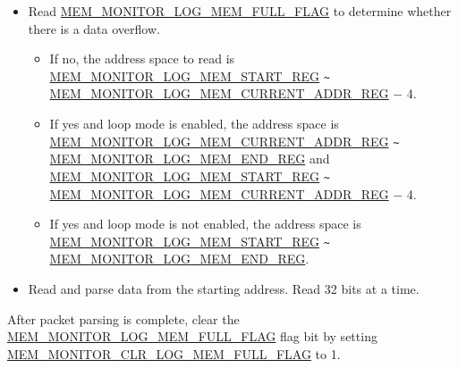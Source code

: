 \documentclass[main\_\_EN.tex]{subfiles}
\begin{document}
\begin{itemize}
    \item Read \hyperref[fielddesc:MEMMONITORLOGMEMFULLFLAG]{MEM\_MONITOR\_LOG\_MEM\_FULL\_FLAG} to determine whether there is a data overflow.
    \begin{itemize} 
        \item If no, the address space to read is \hyperref[regdesc:MEMMONITORLOGMEMSTARTREG]{MEM\_MONITOR\_LOG\_MEM\_START\_REG}  \verb+~+ \hyperref[regdesc:MEMMONITORLOGMEMCURRENTADDRREG]{MEM\_MONITOR\_LOG\_MEM\_CURRENT\_ADDR\_REG} $-$ 4.
        \item If yes and loop mode is enabled, the address space is \hyperref[regdesc:MEMMONITORLOGMEMCURRENTADDRREG]{MEM\_MONITOR\_LOG\_MEM\_CURRENT\_ADDR\_REG} \verb+~+ \hyperref[regdesc:MEMMONITORLOGMEMENDREG]{MEM\_MONITOR\_LOG\_MEM\_END\_REG} and \hyperref[regdesc:MEMMONITORLOGMEMSTARTREG]{MEM\_MONITOR\_LOG\_MEM\_START\_REG} \verb+~+ \hyperref[regdesc:MEMMONITORLOGMEMCURRENTADDRREG]{MEM\_MONITOR\_LOG\_MEM\_CURRENT\_ADDR\_REG} $-$ 4.
        \item If yes and loop mode is not enabled, the address space is \hyperref[regdesc:MEMMONITORLOGMEMSTARTREG]{MEM\_MONITOR\_LOG\_MEM\_START\_REG} \verb+~+ \hyperref[regdesc:MEMMONITORLOGMEMENDREG]{MEM\_MONITOR\_LOG\_MEM\_END\_REG}.
    \end{itemize}
    \item Read and parse data from the starting address. Read 32 bits at a time.
\end{itemize}

After packet parsing is complete, clear the \hyperref[fielddesc:MEMMONITORLOGMEMFULLFLAG]{MEM\_MONITOR\_LOG\_MEM\_FULL\_FLAG} flag bit by setting \hyperref[fielddesc:MEMMONITORCLRLOGMEMFULLFLAG]{MEM\_MONITOR\_CLR\_LOG\_MEM\_FULL\_FLAG} to 1.


\end{document}
